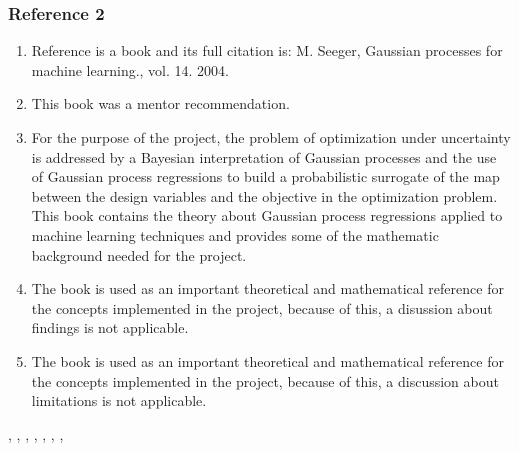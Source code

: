 \documentclass{journal}
\begin{document}
\subsubsection{Reference 2}
\begin{enumerate}
	\item Reference  \cite{Seeger2004} is a book and its full citation is: M. Seeger, Gaussian processes for machine learning., vol. 14. 2004.
	\item This book was a mentor recommendation.
	\item For the purpose of the project, the problem of optimization under uncertainty is addressed by a Bayesian interpretation of Gaussian processes and the use of Gaussian process regressions to build a probabilistic surrogate of the map between the design variables and the objective in the optimization problem. This book contains the theory about Gaussian process regressions applied to machine learning techniques and provides some of the mathematic background needed for the project.
	\item The book is used as an important theoretical and mathematical reference for the concepts implemented in the project, because of this, a disussion about findings is not applicable.
	\item The book is used as an important theoretical and mathematical reference for the concepts implemented in the project, because of this, a discussion about limitations is not applicable.
\end{enumerate}


 \cite{Davidson-Pilon2014}, \cite{Wang2016}, \cite{Schaul2011}, \cite{Li2014}, \cite{Pandita2016}, \cite{Costa2006}, \cite{Guo2007}, \cite{Huang2006}
\end{document}

